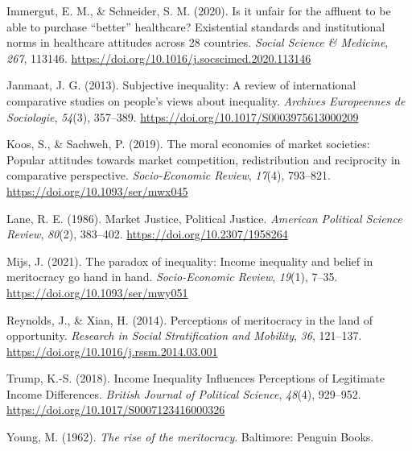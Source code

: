 \documentclass[
  12pt,
  letterpaper,
  DIV=11,
  numbers=noendperiod]{scrartcl}
\newlength{\cslhangindent}
\newenvironment{CSLReferences}[2] %
 {\begin{list}{}{%
  \setlength{\itemindent}{0pt}
  \setlength{\leftmargin}{0pt}
  \setlength{\parsep}{0pt}
  \ifodd #1
   \setlength{\leftmargin}{\cslhangindent}
   \setlength{\itemindent}{-1\cslhangindent}
  \fi
  \setlength{\itemsep}{#2\baselineskip}}}
 {\end{list}}
\begin{document}
\begin{CSLReferences}{1}{0}
Immergut, E. M., \& Schneider, S. M. (2020). Is it unfair for the
affluent to be able to purchase {``better''} healthcare? {Existential}
standards and institutional norms in healthcare attitudes across 28
countries. \emph{Social Science \& Medicine}, \emph{267}, 113146.
\url{https://doi.org/10.1016/j.socscimed.2020.113146}

Janmaat, J. G. (2013). Subjective inequality: {A} review of
international comparative studies on people's views about inequality.
\emph{Archives Europeennes de Sociologie}, \emph{54}(3), 357--389.
\url{https://doi.org/10.1017/S0003975613000209}

Koos, S., \& Sachweh, P. (2019). The moral economies of market
societies: Popular attitudes towards market competition, redistribution
and reciprocity in comparative perspective. \emph{Socio-Economic
Review}, \emph{17}(4), 793--821.
\url{https://doi.org/10.1093/ser/mwx045}

Lane, R. E. (1986). Market {Justice}, {Political Justice}.
\emph{American Political Science Review}, \emph{80}(2), 383--402.
\url{https://doi.org/10.2307/1958264}

Mijs, J. (2021). The paradox of inequality: Income inequality and belief
in meritocracy go hand in hand. \emph{Socio-Economic Review},
\emph{19}(1), 7--35. \url{https://doi.org/10.1093/ser/mwy051}

Reynolds, J., \& Xian, H. (2014). Perceptions of meritocracy in the land
of opportunity. \emph{Research in Social Stratification and Mobility},
\emph{36}, 121--137. \url{https://doi.org/10.1016/j.rssm.2014.03.001}

Trump, K.-S. (2018). Income {Inequality Influences Perceptions} of
{Legitimate Income Differences}. \emph{British Journal of Political
Science}, \emph{48}(4), 929--952.
\url{https://doi.org/10.1017/S0007123416000326}

Young, M. (1962). \emph{The rise of the meritocracy}. Baltimore: Penguin
Books.

\end{CSLReferences}
\end{document}
